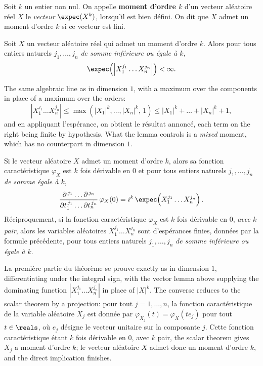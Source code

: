 \begin{definition}
Soit $k$ un entier non nul. On appelle \textbf{moment d'ordre $k$} d'un vecteur aléatoire
réel $X$ le \emph{vecteur} $\expec(X^{k})$, lorsqu'il est bien défini. On dit que $X$ admet
un moment d'ordre $k$ si ce vecteur est fini.
\end{definition}

\begin{lemma}
Soit $X$ un vecteur aléatoire réel qui admet un moment d'ordre $k$. Alors pour tous entiers
naturels $j_{1},\dots,j_{n}$ \emph{de somme inférieure ou égale à $k$},
\[
  \expec\!\left(\left|X_{1}^{j_{1}} \dots X_{n}^{j_{n}}\right|\right) < \infty.
\]
\end{lemma}

\begin{remark}
The same algebraic line as in dimension $1$, with a maximum over the components in place of
a maximum over the orders:
\[
  \left|X_{1}^{j_{1}} \dots X_{n}^{j_{n}}\right| \leq
  \max\!\left(|X_{1}|^{k},\dots,|X_{n}|^{k},\,1\right) \leq |X_{1}|^{k} + \dots +
  |X_{n}|^{k} + 1,
\]
and en appliquant l'espérance, on obtient le résultat annoncé, each term on the right being
finite by hypothesis. What the lemma controls is a \emph{mixed} moment, which has no
counterpart in dimension $1$.
\end{remark}

\begin{theorem}
Si le vecteur aléatoire $X$ admet un moment d'ordre $k$, alors sa fonction caractéristique
$\varphi_{X}$ est $k$ fois dérivable en $0$ et pour tous entiers naturels
$j_{1},\dots,j_{n}$ \emph{de somme égale à $k$},
\[
  \frac{\partial^{\,j_{1}} \dots \partial^{\,j_{n}}} {\partial t_{1}^{\,j_{1}} \dots
  \partial t_{n}^{\,j_{n}}}\, \varphi_{X}(0) = i^{k}\,\expec\!\left(X_{1}^{j_{1}} \dots
  X_{n}^{j_{n}}\right).
\]
Réciproquement, si la fonction caractéristique $\varphi_{X}$ est $k$ fois dérivable en $0$,
\emph{avec $k$ pair}, alors les variables aléatoires $X_{1}^{j_{1}} \dots X_{n}^{j_{n}}$ sont
d'espérances finies, données par la formule précédente, pour tous entiers naturels
$j_{1},\dots,j_{n}$ \emph{de somme inférieure ou égale à $k$}.
\end{theorem}

\begin{remark}
La première partie du théorème se prouve exactly as in dimension $1$, differentiating under
the integral sign, with the vector lemma above supplying the dominating function
$\left|X_{1}^{j_{1}}\dots X_{n}^{j_{n}}\right|$ in place of $|X|^{k}$. The converse reduces
to the scalar theorem by a projection: pour tout $j = 1,\dots,n$, la fonction caractéristique
de la variable aléatoire $X_{j}$ est donnée par $\varphi_{X_{j}}(t) = \varphi_{X}(t e_{j})$
pour tout $t \in \reals$, où $e_{j}$ désigne le vecteur unitaire sur la composante $j$. Cette
fonction caractéristique étant $k$ fois dérivable en $0$, avec $k$ pair, the scalar theorem gives
$X_{j}$ a moment d'ordre $k$; le vecteur aléatoire $X$ admet donc un moment d'ordre $k$, and
the direct implication finishes.
\end{remark}

